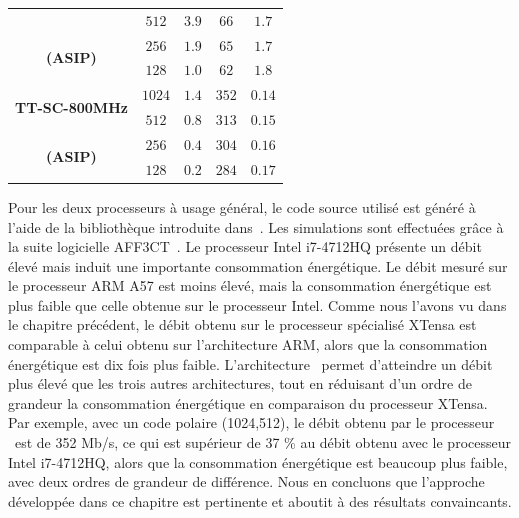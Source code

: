 \begin{table}
\begin{tabular}{ccccc}
                                                & $512$    & $3.9$  & $66$  & $1.7$ \\

     \multirow{2}{*}{\bf (ASIP)}                & $256$    & $1.9$  & $65$  & $1.7$ \\

                                                & $128$    & $1.0$  & $62$  & $1.8$ \\

    \midrule

    \multirow{2}{*}{\bf TT-SC-800MHz}            & $1024$  & $1.4$   & $352$ & $0.14$   \\ %

                                                & $512$    & $0.8$  & $313$ & $0.15$   \\ %

     \multirow{2}{*}{\bf (ASIP)}                & $256$    & $0.4$  & $304$ & $0.16$   \\ %

                                                & $128$    & $0.2$  & $284$ & $0.17$   \\ %

    \bottomrule
  \end{tabular}
\end{table}

Pour les deux processeurs à usage général, le code source utilisé est généré à l'aide de la bibliothèque introduite dans~\cite{cassagne_efficient_2015}. Les simulations sont effectuées grâce à la suite logicielle AFF3CT~\cite{cassagne_fast_2017}. Le processeur Intel i7-4712HQ présente un débit élevé mais induit une importante consommation énergétique. Le débit mesuré sur le processeur ARM A57 est moins élevé, mais la consommation énergétique est plus faible que celle obtenue sur le processeur Intel. Comme nous l'avons vu dans le chapitre précédent, le débit obtenu sur le processeur spécialisé XTensa est comparable à celui obtenu sur l'architecture ARM, alors que la consommation énergétique est dix fois plus faible. L'architecture \TTSC~permet d'atteindre un débit plus élevé que les trois autres architectures, tout en réduisant d'un ordre de grandeur la consommation énergétique en comparaison du processeur XTensa. Par exemple, avec un code polaire (1024,512), le débit obtenu par le processeur \TTSC~est de 352 Mb/s, ce qui est supérieur de 37 \% au débit obtenu avec le processeur Intel i7-4712HQ, alors que la consommation énergétique est beaucoup plus faible, avec deux ordres de grandeur de différence. Nous en concluons que l'approche développée dans ce chapitre est pertinente et aboutit à des résultats convaincants.

